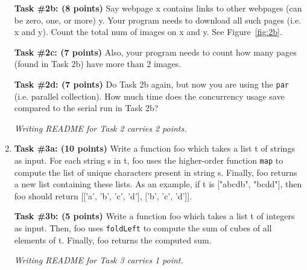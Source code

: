 \documentclass[paper=letter, fontsize=11pt]{scrartcl} %
\begin{document}
\begin{enumerate}
        \textbf{Task \#2b: (8 points)} Say webpage x contains links to other webpages (can be zero, one, or more) y.
Your program needs to download all such pages (i.e. x and y). Count the total num of images on x and y. See Figure~\ref{fig:2b}.

        \textbf{Task \#2c: (7 points)} Also, your program needs to count how many pages (found in Task 2b) have more than 2 images.

        \textbf{Task \#2d: (7 points)} Do Task 2b again, but now you are using the \texttt{par} (i.e. parallel collection).
How much time does the concurrency usage save compared to the serial run in Task 2b?

\emph{Writing README for Task 2 carries 2 points.}

\newpage

        \item \textbf{Task \#3a: (10 points)} Write a function foo which takes a list t of strings as input. 
        For each string s in t, foo uses the higher-order function \texttt{map} to compute the list of unique characters present in string s. Finally, foo returns a new list containing these lists. As an example, if t is ["abcdb", "bcdd"], then foo should return [['a', 'b', 'c', 'd'], ['b', 'c', 'd']].

        \textbf{Task \#3b: (5 points)} Write a function foo which takes a list t of integers as input. 
        Then, foo uses \texttt{foldLeft} to compute the sum of cubes of all elements of t. Finally, foo returns the computed sum.

\emph{Writing README for Task 3 carries 1 point.}

    
    \end{enumerate}
\end{document}

